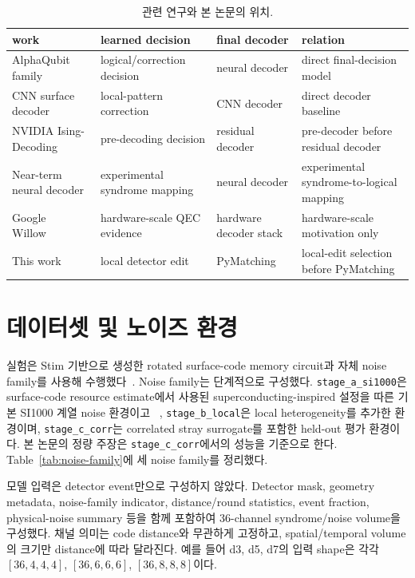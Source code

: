 \documentclass[aps,prd,12pt,twocolumn,superscriptaddress,floatfix,longbibliography]{revtex4-2}
\newcommand{\thesiscaptionfont}{\footnotesize}
\begin{document}
\begin{table}[!tbp]
\caption{\thesiscaptionfont 관련 연구와 본 논문의 위치.}
\label{tab:related-work}
\centering
\scriptsize
\begin{tabular*}{\textwidth}{@{\extracolsep{\fill}}llll}
\toprule
work & learned decision & final decoder & relation \\
\midrule
AlphaQubit family~\cite{alphaqubit,alphaqubit2} & logical/correction decision & neural decoder & direct final-decision model \\
CNN surface decoder~\cite{convnnsurface} & local-pattern correction & CNN decoder & direct decoder baseline \\
NVIDIA Ising-Decoding~\cite{nvidiaising} & pre-decoding decision & residual decoder & pre-decoder before residual decoder \\
Near-term neural decoder~\cite{neartermnn} & experimental syndrome mapping & neural decoder & experimental syndrome-to-logical mapping \\
Google Willow~\cite{willowthreshold} & hardware-scale QEC evidence & hardware decoder stack & hardware-scale motivation only \\
This work & local detector edit & PyMatching & local-edit selection before PyMatching \\
\bottomrule
\end{tabular*}
\end{table}

\section{데이터셋 및 노이즈 환경}

실험은 Stim 기반으로 생성한 rotated surface-code memory circuit과 자체 noise
family를 사용해 수행했다~\cite{stim}. Noise family는 단계적으로 구성했다.
\texttt{stage\_a\_si1000}은 surface-code resource estimate에서 사용된
superconducting-inspired 설정을 따른 기본 SI1000 계열 noise 환경이고
~\cite{honeycombmemory},
\texttt{stage\_b\_local}은 local heterogeneity를 추가한 환경이며,
\texttt{stage\_c\_corr}는 correlated stray surrogate를 포함한 held-out 평가
환경이다. 본 논문의 정량 주장은 \texttt{stage\_c\_corr}에서의 성능을 기준으로
한다. Table~\ref{tab:noise-family}에 세 noise family를 정리했다.

모델 입력은 detector event만으로 구성하지 않았다. Detector mask, geometry
metadata, noise-family indicator, distance/round statistics, event fraction,
physical-noise summary 등을 함께 포함하여 36-channel syndrome/noise volume을
구성했다. 채널 의미는 code distance와 무관하게 고정하고, spatial/temporal
volume의 크기만 distance에 따라 달라진다. 예를 들어 d3, d5, d7의 입력 shape은
각각 \([36,4,4,4]\), \([36,6,6,6]\), \([36,8,8,8]\)이다.
\end{document}

